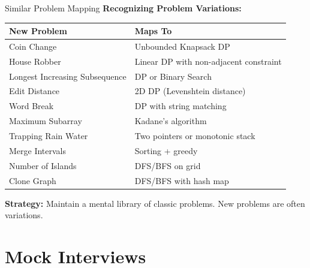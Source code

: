 \documentclass[aspectratio=169,xcolor=dvipsnames]{beamer}
\begin{document}
\begin{frame}{Similar Problem Mapping}
  \textbf{Recognizing Problem Variations:}

  \vspace{0.3cm}
  \begin{table}
    \centering
    \tiny
    \begin{tabular}{ll}
      \hline
      \textbf{New Problem} & \textbf{Maps To} \\
      \hline
      Coin Change & Unbounded Knapsack DP \\
      House Robber & Linear DP with non-adjacent constraint \\
      Longest Increasing Subsequence & DP or Binary Search \\
      Edit Distance & 2D DP (Levenshtein distance) \\
      Word Break & DP with string matching \\
      Maximum Subarray & Kadane's algorithm \\
      Trapping Rain Water & Two pointers or monotonic stack \\
      Merge Intervals & Sorting + greedy \\
      Number of Islands & DFS/BFS on grid \\
      Clone Graph & DFS/BFS with hash map \\
      \hline
    \end{tabular}
  \end{table}

  \vspace{0.3cm}
  \textbf{Strategy:} Maintain a mental library of classic problems. New problems are often variations.
\end{frame}

\section{Mock Interviews}
\end{document}
